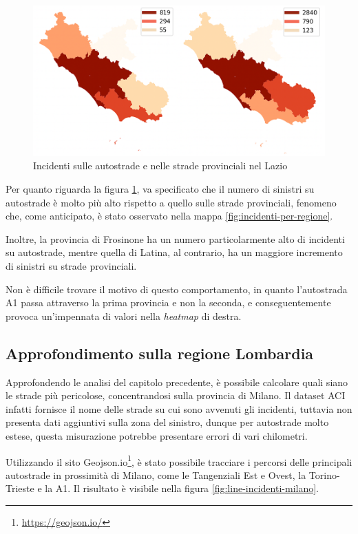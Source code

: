 \documentclass[a4paper]{report}
\newcommand{\quotestyle}[1]{\textit{#1}}
\begin{document}
\begin{figure}
    \includegraphics[width=\linewidth]{img_unite/lazio_autostrade_provinciali.png}
    \caption{Incidenti sulle autostrade e nelle strade provinciali nel Lazio}
    \label{fig:lazio-strade}
\end{figure}

Per quanto riguarda la figura \ref{fig:lazio-strade}, va 
specificato che il numero di sinistri su autostrade è molto più alto rispetto 
a quello sulle strade provinciali, fenomeno che, come anticipato, è stato osservato 
nella mappa \ref{fig:incidenti-per-regione}. 

Inoltre, la provincia di Frosinone ha un numero particolarmente alto di incidenti su 
autostrade, mentre quella di Latina, al contrario, ha un maggiore incremento di 
sinistri su strade provinciali. 

Non è difficile trovare il motivo di questo comportamento, in quanto l'autostrada A1 passa 
attraverso la prima provincia e non la seconda, e conseguentemente provoca 
un'impennata di valori nella \quotestyle{heatmap} di destra. 


\subsection{Approfondimento sulla regione Lombardia}

Approfondendo le analisi del capitolo precedente, è possibile calcolare quali siano 
le strade più pericolose, concentrandosi sulla provincia di Milano. 
Il dataset ACI infatti fornisce il nome delle strade su cui sono avvenuti gli incidenti, 
tuttavia non presenta dati aggiuntivi sulla zona del sinistro, dunque per autostrade molto 
estese, questa misurazione potrebbe presentare errori di vari chilometri. 

Utilizzando il sito Geojson.io\footnote{\url{https://geojson.io/}}, 
è stato possibile tracciare i percorsi delle principali autostrade in prossimità di 
Milano, come le Tangenziali Est e Ovest, la Torino-Trieste e la A1. 
Il risultato è visibile nella figura \ref{fig:line-incidenti-milano}. 
\end{document}
